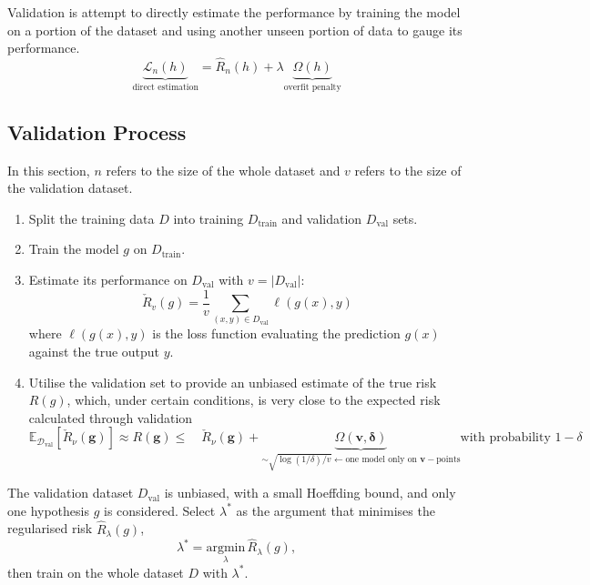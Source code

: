 Validation is attempt to directly estimate the performance by training the model on a portion of the dataset and using another unseen portion of data to gauge its performance.
\[\underbrace{\mathcal{L}_n(h)}_{\text{direct estimation}}=\widehat{R}_n(h)+\lambda\underbrace{\Omega(h)}_{\text{overfit penalty}}\]

\subsection*{Validation Process}
In this section, $n$ refers to the size of the whole dataset and $v$ refers to the size of the validation dataset.
\begin{enumerate}
  \item Split the training data \( D \) into training \( D_{\text{train}} \) and validation \( D_{\text{val}} \) sets.
  \item Train the model \( g \) on \( D_{\text{train}} \).
  \item Estimate its performance on \( D_{\text{val}} \) with \( v = |D_{\text{val}}| \):
  \begin{equation}
    \check{R}_{v}(g) = \frac{1}{v} \sum_{(x,y) \in D_{\text{val}}} \ell(g(x), y)
  \end{equation}
  where \( \ell(g(x), y) \) is the loss function evaluating the prediction \( g(x) \) against the true output \( y \).
  \item Utilise the validation set to provide an unbiased estimate of the true risk \( R(g) \), which, under certain conditions, is very close to the expected risk calculated through validation \[\mathbb{E}_{\mathcal{D}_{\mathrm{val}}}\left[\check{R}_{\nu}(\mathbf{g})\right]\approx R(\mathbf{g})\leqslant\quad\check{R}_{\nu}(\mathbf{g})+\underbrace{\Omega(\mathbf{v},\mathbf{\delta})}_{\sim\sqrt{\log(1/\delta)/v}\leftarrow\text{one model only on }\mathbf{v}-\mathrm{points}} \text{with probability }1-\delta \]
\end{enumerate}

The validation dataset \( D_{\text{val}} \) is unbiased, with a small Hoeffding bound, and only one hypothesis \( g \) is considered.
Select \( \lambda^* \) as the argument that minimises the regularised risk \( \hat{R}_{\lambda}(g) \),
\begin{equation*}
    \lambda^* = \underset{\lambda}{\mathrm{argmin}} \, \hat{R}_{\lambda}(g),
\end{equation*}
then train on the whole dataset \( D \) with \( \lambda^* \).


